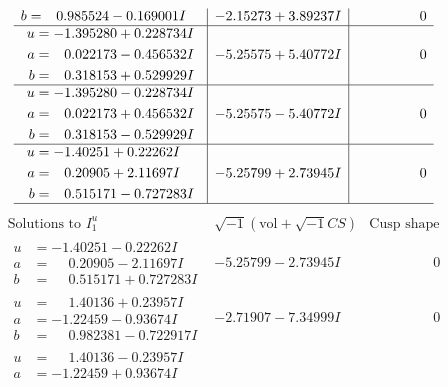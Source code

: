 \documentclass[1p]{elsarticle_modified}
\theoremstyle{definition}
\newcommand{\I}{\sqrt{-1}}
\begin{document}
$$\begin{array}{c|c|c}
\begin{aligned}
b &= \phantom{-}0.985524 - 0.169001 I\end{aligned}
 & -2.15273 + 3.89237 I & \phantom{-0.000000 } 0 \\ \hline\begin{aligned}
u &= -1.395280 + 0.228734 I \\
a &= \phantom{-}0.022173 - 0.456532 I \\
b &= \phantom{-}0.318153 + 0.529929 I\end{aligned}
 & -5.25575 + 5.40772 I & \phantom{-0.000000 } 0 \\ \hline\begin{aligned}
u &= -1.395280 - 0.228734 I \\
a &= \phantom{-}0.022173 + 0.456532 I \\
b &= \phantom{-}0.318153 - 0.529929 I\end{aligned}
 & -5.25575 - 5.40772 I & \phantom{-0.000000 } 0 \\ \hline\begin{aligned}
u &= -1.40251 + 0.22262 I \\
a &= \phantom{-}0.20905 + 2.11697 I \\
b &= \phantom{-}0.515171 - 0.727283 I\end{aligned}
 & -5.25799 + 2.73945 I & \phantom{-0.000000 } 0\\
 \hline 
 \end{array}$$\newpage$$\begin{array}{c|c|c}  
\text{Solutions to }I^u_{1}& \I (\text{vol} + \sqrt{-1}CS) & \text{Cusp shape}\\
 \hline 
\begin{aligned}
u &= -1.40251 - 0.22262 I \\
a &= \phantom{-}0.20905 - 2.11697 I \\
b &= \phantom{-}0.515171 + 0.727283 I\end{aligned}
 & -5.25799 - 2.73945 I & \phantom{-0.000000 } 0 \\ \hline\begin{aligned}
u &= \phantom{-}1.40136 + 0.23957 I \\
a &= -1.22459 - 0.93674 I \\
b &= \phantom{-}0.982381 - 0.722917 I\end{aligned}
 & -2.71907 - 7.34999 I & \phantom{-0.000000 } 0 \\ \hline\begin{aligned}
u &= \phantom{-}1.40136 - 0.23957 I \\
a &= -1.22459 + 0.93674 I \\

\end{aligned}
\end{array}$$
\end{document}

